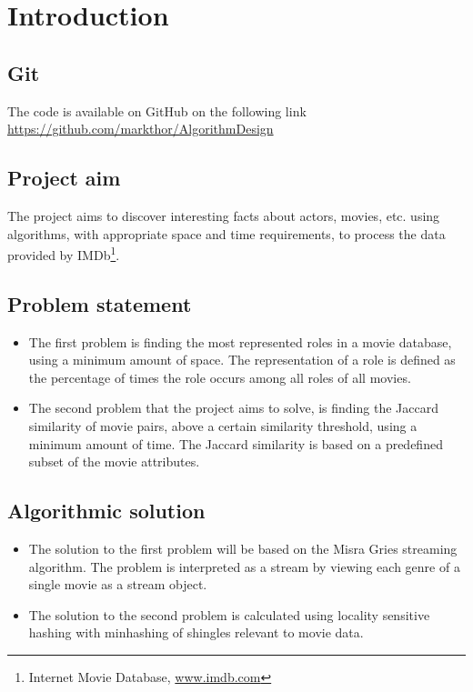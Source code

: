 \section{Introduction}

\subsection{Git}
The code is available on GitHub on the following link \url{https://github.com/markthor/AlgorithmDesign}

\subsection{Project aim}
The project aims to discover interesting facts about actors, movies, etc. using algorithms, with appropriate space and time requirements, to process the data provided by IMDb\footnote{Internet Movie Database, \url{www.imdb.com}}.

\subsection{Problem statement}
\begin{itemize}
	\item The first problem is finding the most represented roles in a movie database, using a minimum amount of space. The representation of a role is defined as the percentage of times the role occurs among all roles of all movies.
	\item The second problem that the project aims to solve, is finding the Jaccard similarity of movie pairs, above a certain similarity threshold, using a minimum amount of time. The Jaccard similarity is based on a predefined subset of the movie attributes.
\end{itemize}

\subsection{Algorithmic solution}
\begin{itemize}
	\item The solution to the first problem will be based on the Misra Gries streaming algorithm. The problem is interpreted as a stream by viewing each genre of a single movie as a stream object.
	\item The solution to the second problem is calculated using locality sensitive hashing with minhashing of shingles relevant to movie data.
\end{itemize}

